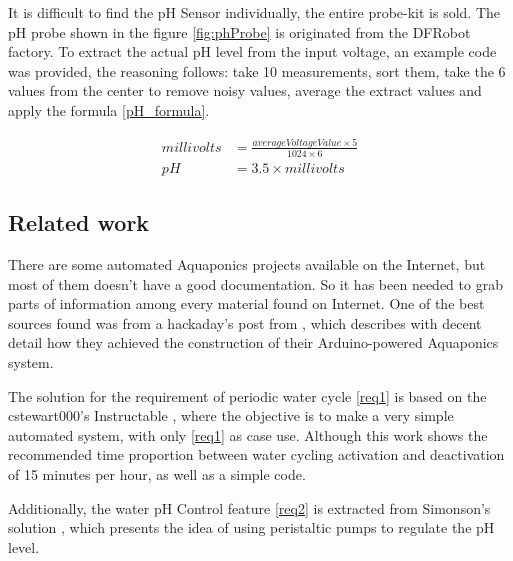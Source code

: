 It is difficult to find the pH Sensor individually, 
the entire probe-kit is sold.
The pH probe shown in the figure \ref{fig:phProbe} is originated from the DFRobot factory.
To extract the actual pH level from the input voltage,
an example code was provided,
the reasoning follows: take 10 measurements,
sort them,
take the 6 values from the center to remove noisy values,
average the extract values and apply the formula \ref{pH_formula}.

\begin{align}
    millivolts &= \frac{averageVoltageValue \times 5}{1024 \times 6}  \label{pH_formula} \\
    pH &= 3.5 \times millivolts
\end{align}


\subsection{Related work}
There are some automated Aquaponics projects available on the Internet,
but most of them doesn't have a good documentation.
So it has been needed to grab parts of information among every material found on Internet.
One of the best sources found was from a hackaday's post from \cite{GarethColeman2014},
which describes with decent detail how they achieved the construction of their Arduino-powered Aquaponics system.

The solution for the requirement of periodic water cycle \ref{req1} is based on the cstewart000's Instructable \cite{simpleArduinoAquaponics},
where the objective is to make a very simple automated system,
with only \ref{req1} as case use.
Although this work shows the recommended time proportion between water cycling activation and deactivation of 15 minutes per hour,
as well as a simple code.

Additionally,
the water pH Control feature \ref{req2} is extracted from Simonson's solution \cite{elder_austin_simonson_hyduino},
which presents the idea of using peristaltic pumps to regulate the pH level.


